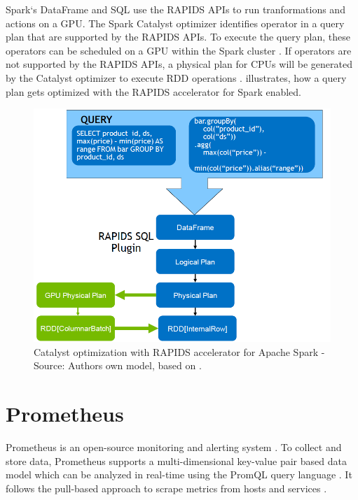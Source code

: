 Spark`s DataFrame and SQL use the RAPIDS APIs to run tranformations and actions on a GPU.
The Spark Catalyst optimizer identifies operator in a query plan that are supported by the RAPIDS APIs. To execute the query plan, these operators can be scheduled on a GPU within the Spark cluster \cite{Mcdonald2020SparkRapids}. If operators are not supported by the RAPIDS APIs, a physical plan for CPUs will be generated by the Catalyst optimizer to execute RDD operations \cite{Mcdonald2020SparkRapids}.  illustrates, how a query plan gets optimized with the RAPIDS accelerator for Spark enabled.

\begin{figure}[h]%
\centering
\includegraphics[scale=0.25]{images/04_technical_background/rapids_query_plan}%
\caption{Catalyst optimization with RAPIDS accelerator for Apache Spark - Source: Authors own model, based on \cite{Mcdonald2020SparkRapids}.}%
\label{fig:rapids_query_plan}%
\end{figure}


\section{Prometheus}
Prometheus is an open-source monitoring and alerting system \cite{Prom2020Docs}.
To collect and store data, Prometheus supports a multi-dimensional key-value pair based data model which can be analyzed in real-time using the PromQL query language \cite{Pandey2020Monitoring}.
It follows the pull-based approach to scrape metrics from hosts and services \cite{Bastos2019Prom}.

